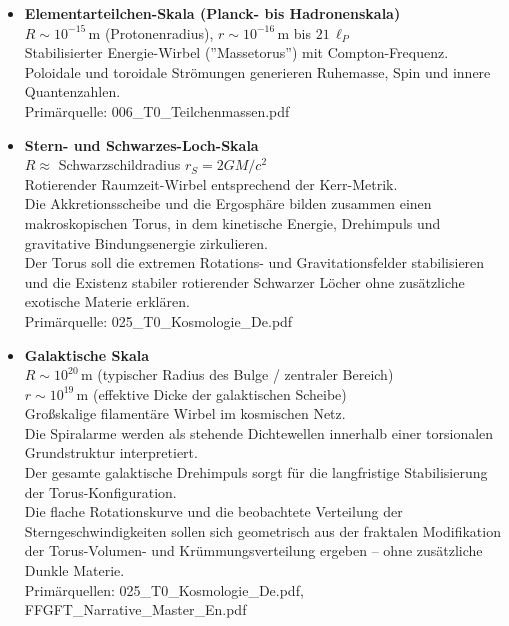 	\begin{itemize}
		\item \textbf{Elementarteilchen-Skala (Planck- bis Hadronenskala)} \\
		$R \sim 10^{-15}\,\text{m}$ (Protonenradius), $r \sim 10^{-16}\,\text{m}$ bis $21\,\ell_P$ \\
		Stabilisierter Energie-Wirbel (''Massetorus'') mit Compton-Frequenz. \\
		Poloidale und toroidale Strömungen generieren Ruhemasse, Spin und innere Quantenzahlen. \\
		Primärquelle: 006\_T0\_Teilchenmassen.pdf
		
		\item \textbf{Stern- und Schwarzes-Loch-Skala} \\
		$R \approx$ Schwarzschildradius $r_S = 2GM/c^2$ \\
		Rotierender Raumzeit-Wirbel entsprechend der Kerr-Metrik. \\
		Die Akkretionsscheibe und die Ergosphäre bilden zusammen einen makroskopischen Torus, in dem kinetische Energie, Drehimpuls und gravitative Bindungsenergie zirkulieren. \\
		Der Torus soll die extremen Rotations- und Gravitationsfelder stabilisieren und die Existenz stabiler rotierender Schwarzer Löcher ohne zusätzliche exotische Materie erklären. \\
		Primärquelle: 025\_T0\_Kosmologie\_De.pdf
		
		\item \textbf{Galaktische Skala} \\
		$R \sim 10^{20}\,\text{m}$ (typischer Radius des Bulge / zentraler Bereich) \\
		$r \sim 10^{19}\,\text{m}$ (effektive Dicke der galaktischen Scheibe) \\
		Großskalige filamentäre Wirbel im kosmischen Netz. \\
		Die Spiralarme werden als stehende Dichtewellen innerhalb einer torsionalen Grundstruktur interpretiert. \\
		Der gesamte galaktische Drehimpuls sorgt für die langfristige Stabilisierung der Torus-Konfiguration. \\
		Die flache Rotationskurve und die beobachtete Verteilung der Sterngeschwindigkeiten sollen sich geometrisch aus der fraktalen Modifikation der Torus-Volumen- und Krümmungsverteilung ergeben – ohne zusätzliche Dunkle Materie. \\
		Primärquellen: 025\_T0\_Kosmologie\_De.pdf, FFGFT\_Narrative\_Master\_En.pdf
		

\end{itemize}
